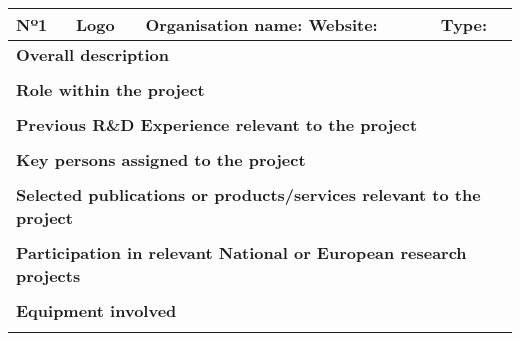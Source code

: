 \begin{longtable}[H]{|p{0.7cm}|p{4cm}|p{7cm}|p{1.3cm}|}
	\hline
	Nº1 & Logo & \textbf{Organisation name:} \newline \textbf{Website:} & Type: \\ \hline
	
	\multicolumn{4}{|p{13cm}|}{\textbf{Overall description}}  \\ \hline
	
	\multicolumn{4}{|p{13cm}|}{}  \\ \hline
	
	\multicolumn{4}{|p{13cm}|}{\textbf{Role within the project}}   \\ \hline
	
	\multicolumn{4}{|p{13cm}|}{}  \\ \hline
	
	\multicolumn{4}{|p{13cm}|}{\textbf{Previous R\&D Experience relevant to the project}}  \\ \hline
	
	\multicolumn{4}{|p{13cm}|}{}  \\ \hline
	
	\multicolumn{4}{|p{13cm}|}{\textbf{Key persons assigned to the project}}   \\ \hline
	
	\multicolumn{4}{|p{13cm}|}{}  \\ \hline
	
	\multicolumn{4}{|p{13cm}|}{\textbf{Selected publications or products/services relevant to the project}}  \\ \hline
	
	\multicolumn{4}{|p{13cm}|}{}  \\ \hline
	
	\multicolumn{4}{|p{13cm}|}{\textbf{Participation in relevant National or European research projects}}  \\ \hline
	
	\multicolumn{4}{|p{13cm}|}{}  \\ \hline
	
	\multicolumn{4}{|p{13cm}|}{\textbf{Equipment involved}}  \\ \hline
	
	\multicolumn{4}{|p{13cm}|}{}  \\ \hline
\end{longtable}